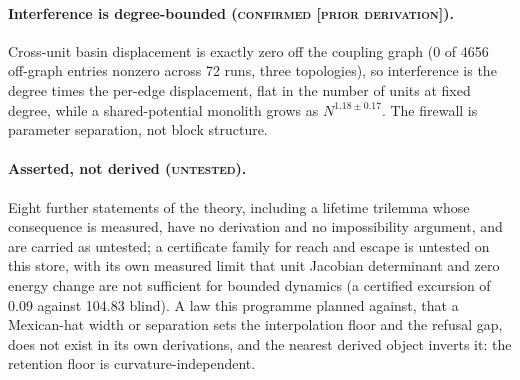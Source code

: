 \documentclass{article}
\begin{document}
\paragraph{Interference is degree-bounded (\textsc{confirmed [prior derivation]}).} Cross-unit
basin displacement is exactly zero off the coupling graph (0 of 4656 off-graph entries nonzero
across 72 runs, three topologies), so interference is the degree times the per-edge displacement,
flat in the number of units at fixed degree, while a shared-potential monolith grows as
$N^{1.18\pm0.17}$. The firewall is parameter separation, not block structure.

\paragraph{Asserted, not derived (\textsc{untested}).} Eight further statements of the theory,
including a lifetime trilemma whose consequence is measured, have no derivation and no
impossibility argument, and are carried as untested; a certificate family for reach and escape is
untested on this store, with its own measured limit that unit Jacobian determinant and zero
energy change are not sufficient for bounded dynamics (a certified excursion of 0.09 against
104.83 blind).
A law this programme planned against, that a Mexican-hat width or separation sets the
interpolation floor and the refusal gap, does not exist in its own derivations, and the nearest
derived object inverts it: the retention floor is curvature-independent.
\end{document}
